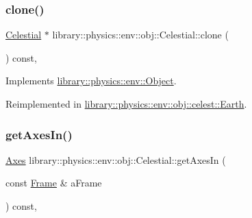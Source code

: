 \mbox{\label{classlibrary_1_1physics_1_1env_1_1obj_1_1_celestial_aaf8aa41a0ff9336eba62c07e3c27f82d}} 
\subsubsection{\texorpdfstring{clone()}{clone()}}
{\footnotesize\ttfamily \hyperlink{classlibrary_1_1physics_1_1env_1_1obj_1_1_celestial}{Celestial} $\ast$ library\+::physics\+::env\+::obj\+::\+Celestial\+::clone (\begin{DoxyParamCaption}{ }\end{DoxyParamCaption}) const\hspace{0.3cm}{\ttfamily [override]}, {\ttfamily [virtual]}}



Implements \hyperlink{classlibrary_1_1physics_1_1env_1_1_object_a498e0d1a15e937a5aa77374c6f899768}{library\+::physics\+::env\+::\+Object}.



Reimplemented in \hyperlink{classlibrary_1_1physics_1_1env_1_1obj_1_1celest_1_1_earth_aca39bec00a2046a3fcef9bf22be52428}{library\+::physics\+::env\+::obj\+::celest\+::\+Earth}.

\mbox{\label{classlibrary_1_1physics_1_1env_1_1obj_1_1_celestial_ad13d0656d681ca53ee4cbfe7792db036}} 
\subsubsection{\texorpdfstring{get\+Axes\+In()}{getAxesIn()}}
{\footnotesize\ttfamily \hyperlink{classlibrary_1_1physics_1_1coord_1_1_axes}{Axes} library\+::physics\+::env\+::obj\+::\+Celestial\+::get\+Axes\+In (\begin{DoxyParamCaption}\item[{const \hyperlink{classlibrary_1_1physics_1_1coord_1_1_frame}{Frame} \&}]{a\+Frame }\end{DoxyParamCaption}) const\hspace{0.3cm}{\ttfamily [override]}, {\ttfamily [virtual]}}



